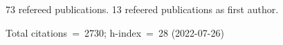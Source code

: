 73 refereed publications. 13 refeered publications as first author.

Total citations~=~2730; h-index~=~28 (2022-07-26)